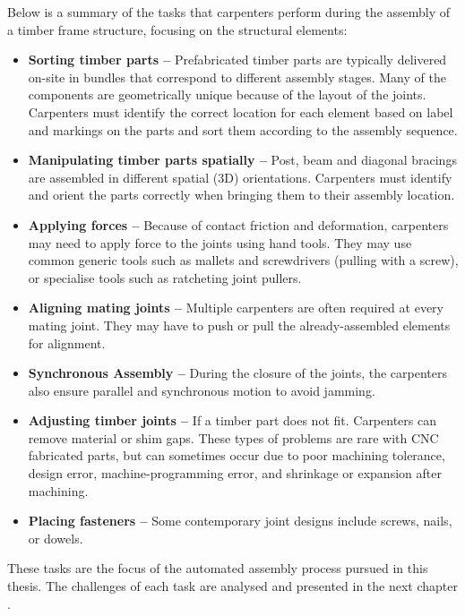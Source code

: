 Below is a summary of the tasks that carpenters perform during the assembly of a timber frame structure, focusing on the structural elements:

\begin{itemize}
	\item \textbf{Sorting timber parts --} Prefabricated timber parts are typically delivered on-site in bundles that correspond to different assembly stages. Many of the components are geometrically unique because of the layout of the joints. Carpenters must identify the correct location for each element based on label and markings on the parts and sort them according to the assembly sequence.

	\item \textbf{Manipulating timber parts spatially --} Post, beam and diagonal bracings are assembled in different spatial (3D) orientations. Carpenters must identify and orient the parts correctly when bringing them to their assembly location.

	\item \textbf{Applying forces --} Because of contact friction and deformation, carpenters may need to apply force to the joints using hand tools. They may use common generic tools such as mallets and screwdrivers (pulling with a screw), or specialise tools such as ratcheting joint pullers. 

	\item \textbf{Aligning mating joints --} Multiple carpenters are often required at every mating joint. They may have to push or pull the already-assembled elements for alignment. 

	\item \textbf{Synchronous Assembly --} During the closure of the joints, the carpenters also ensure parallel and synchronous motion to avoid jamming.

	\item \textbf{Adjusting timber joints --} If a timber part does not fit. Carpenters can remove material or shim gaps. These types of problems are rare with CNC fabricated parts, but can sometimes occur due to poor machining tolerance, design error, machine-programming error, and shrinkage or expansion after machining.

	\item \textbf{Placing fasteners --} Some contemporary joint designs include screws, nails, or dowels.

\end{itemize}

These tasks are the focus of the automated assembly process pursued in this thesis. The challenges of each task are analysed and presented in the next chapter .

